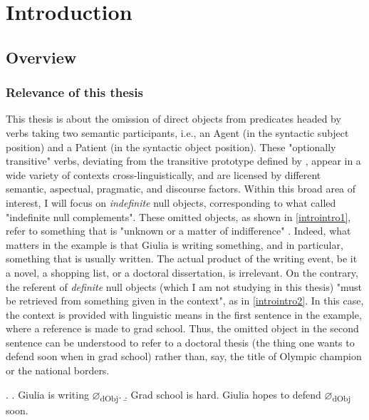 \setchapterpreamble[u]{\margintoc}
\chapter{Introduction}

\section{Overview} 

\subsection{Relevance of this thesis}

This thesis is about the omission of direct objects from predicates headed by verbs taking two semantic participants, i.e., an Agent (in the syntactic subject position) and a Patient (in the syntactic object position). These "optionally transitive" verbs, deviating from the transitive prototype defined by \textcite{HopperThompson1980}, appear in a wide variety of contexts cross-linguistically, and are licensed by different semantic, aspectual, pragmatic, and discourse factors. Within this broad area of interest, I will focus on \textit{indefinite} null objects, corresponding to what \textcite{Fillmore1986} called "indefinite null complements". These omitted objects, as shown in \ref{introintro1}, refer to something that is "unknown or a matter of indifference" \parencite[96]{Fillmore1986}. Indeed, what matters in the example is that Giulia is writing something, and in particular, something that is usually written. The actual product of the writing event, be it a novel, a shopping list, or a doctoral dissertation, is irrelevant. On the contrary, the referent of \textit{definite} null objects (which I am not studying in this thesis) "must be retrieved from something given in the context", as in \ref{introintro2}. In this case, the context is provided with linguistic means in the first sentence in the example, where a reference is made to grad school. Thus, the omitted object in the second sentence can be understood to refer to a doctoral thesis (the thing one wants to defend soon when in grad school) rather than, say, the title of Olympic champion or the national borders.

\ex. \label{introintro} \a. \label{introintro1} Giulia is writing $\varnothing$\textsubscript{dObj}.
\b. \label{introintro2} Grad school is hard. Giulia hopes to defend $\varnothing$\textsubscript{dObj} soon.

